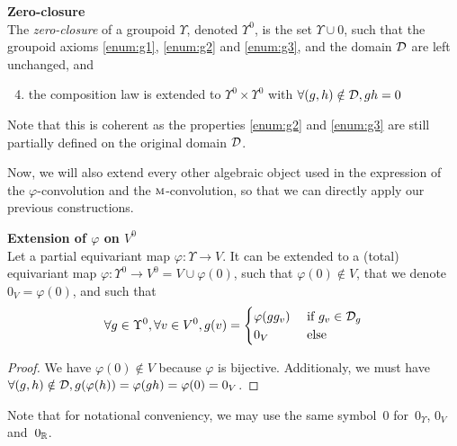 \begin{definition}\textbf{Zero-closure}\\
The \emph{zero-closure} of a groupoid $\Upsilon$, denoted $\Upsilon^0$, is the set $\Upsilon \cup {0}$, such that the groupoid axioms \ref{enum:g1}, \ref{enum:g2} and \ref{enum:g3}, and the domain $\mathcal{D}$ are left unchanged, and
\begin{enumerate}\setcounter{enumi}{3}
\item the composition law is extended to $\Upsilon^0 \times \Upsilon^0$ with $\forall (g,h) \notin \mathcal{D}, gh = 0$
\end{enumerate}
\end{definition}

\begin{remark}Note that this is coherent as the properties \ref{enum:g2} and \ref{enum:g3} are still partially defined on the original domain $\mathcal{D}$.
\end{remark}

Now, we will also extend every other algebraic object used in the expression of the $\varphi$-convolution and the $\operatorname{\textsc{m}}$-convolution, so that we can directly apply our previous constructions.

\begin{lemma}\textbf{Extension of $\varphi$ on $V^0$}\\
Let a partial equivariant map $\varphi: \Upsilon \rightarrow V$. It can be extended to a (total) equivariant map $\varphi: \Upsilon^0 \rightarrow V^0 = V \cup \varphi(0)$, such that $\varphi(0) \notin V$, that we denote $0_V = \varphi(0)$, and such that
\begin{gather*}
	\forall g \in \Upsilon^0, \forall v \in V^0, g(v) = \begin{cases} \varphi(gg_v) &\text{ if } g_v \in \mathcal{D}_g\\ 0_V &\text{ else}\end{cases}
\end{gather*}
\end{lemma}
\begin{proof}
We have $\varphi(0) \notin V$ because $\varphi$ is bijective. Additionaly, we must have $\forall (g,h) \notin \mathcal{D}, g(\varphi(h)) = \varphi(gh) = \varphi(0) = 0_V$.
\end{proof}

\begin{remark} Note that for notational conveniency, we may use the same symbol~$0$ for~$0_{\Upsilon}$, $0_V$ and~$0_{\mathbb{R}}$.
\end{remark}

